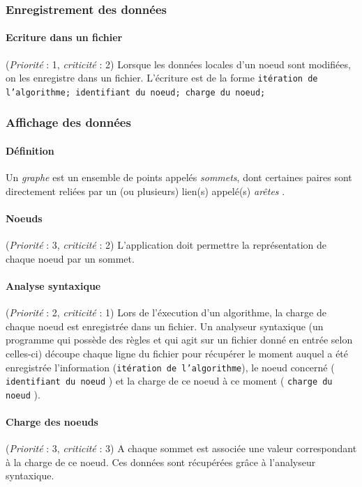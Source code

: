 \documentclass[12pt]{article}
\newcommand{\besoin}[2] {
  (\textit{Priorité} : #1, \textit{criticité} : #2)
}
\begin{document}
\subsubsection{Enregistrement des données}

\paragraph{Ecriture dans un fichier} \besoin{1}{2} Lorsque les données locales d'un noeud sont modifiées, on les enregistre dans un fichier.
L'écriture est de la forme \texttt{itération de l'algorithme; identifiant du noeud; charge du noeud;}

\subsubsection{Affichage des données}

\paragraph{Définition} Un \textit{graphe} est un ensemble de points appelés \textit{sommets}, dont certaines paires sont directement reliées par un (ou plusieurs) lien(s) appelé(s) \textit{arêtes} \cite{graphe}. 

\paragraph{Noeuds} \besoin{3}{2} L'application doit permettre la représentation de chaque noeud par un sommet.

\paragraph{Analyse syntaxique} \besoin{2}{1} Lors de l'éxecution d'un algorithme, la charge de chaque noeud est enregistrée dans un fichier.
Un analyseur syntaxique (un programme qui possède des règles et qui agit sur un fichier donné en entrée selon celles-ci) découpe chaque ligne du fichier pour récupérer le moment auquel a été enregistrée l'information (\texttt{itération de l'algorithme}),
le noeud concerné ( \texttt{ identifiant du noeud} ) et la charge de ce noeud à ce moment ( \texttt{charge du noeud} ).

\paragraph{Charge des noeuds}  \besoin{3}{3} A chaque sommet est associée une valeur correspondant à la charge de ce noeud.
Ces données sont récupérées grâce à l'analyseur syntaxique.
\end{document}
